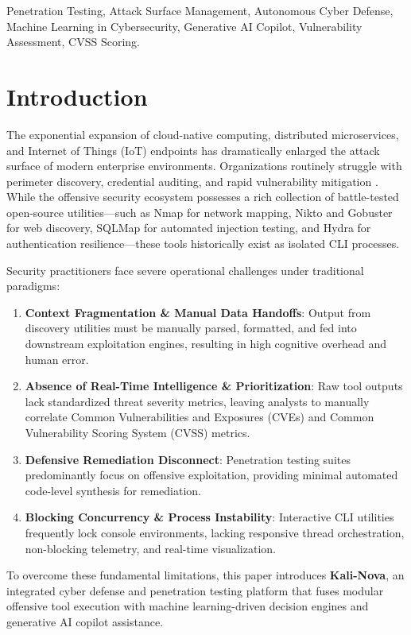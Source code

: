\documentclass[conference]{IEEEtran}
\begin{document}
\begin{IEEEkeywords}
Penetration Testing, Attack Surface Management, Autonomous Cyber Defense, Machine Learning in Cybersecurity, Generative AI Copilot, Vulnerability Assessment, CVSS Scoring.
\end{IEEEkeywords}

\section{Introduction}
The exponential expansion of cloud-native computing, distributed microservices, and Internet of Things (IoT) endpoints has dramatically enlarged the attack surface of modern enterprise environments. Organizations routinely struggle with perimeter discovery, credential auditing, and rapid vulnerability mitigation \cite{sommestad2013cyber}. While the offensive security ecosystem possesses a rich collection of battle-tested open-source utilities—such as Nmap for network mapping, Nikto and Gobuster for web discovery, SQLMap for automated injection testing, and Hydra for authentication resilience—these tools historically exist as isolated CLI processes.

Security practitioners face severe operational challenges under traditional paradigms:
\begin{enumerate}
    \item \textbf{Context Fragmentation \& Manual Data Handoffs}: Output from discovery utilities must be manually parsed, formatted, and fed into downstream exploitation engines, resulting in high cognitive overhead and human error.
    \item \textbf{Absence of Real-Time Intelligence & Prioritization}: Raw tool outputs lack standardized threat severity metrics, leaving analysts to manually correlate Common Vulnerabilities and Exposures (CVEs) and Common Vulnerability Scoring System (CVSS) metrics.
    \item \textbf{Defensive Remediation Disconnect}: Penetration testing suites predominantly focus on offensive exploitation, providing minimal automated code-level synthesis for remediation.
    \item \textbf{Blocking Concurrency & Process Instability}: Interactive CLI utilities frequently lock console environments, lacking responsive thread orchestration, non-blocking telemetry, and real-time visualization.
\end{enumerate}

To overcome these fundamental limitations, this paper introduces \textbf{Kali-Nova}, an integrated cyber defense and penetration testing platform that fuses modular offensive tool execution with machine learning-driven decision engines and generative AI copilot assistance. 
\end{document}
